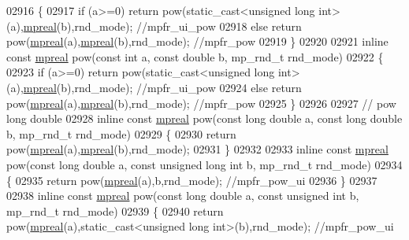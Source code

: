 \begin{DoxyCode}
{{02916 \{
02917     \textcolor{keywordflow}{if} (a>=0)   \textcolor{keywordflow}{return} pow(static\_cast<unsigned long int>(a),\hyperlink{classmpfr_1_1mpreal}{mpreal}(b),rnd\_mode); \textcolor{comment}{//mpfr\_ui\_pow}
02918     \textcolor{keywordflow}{else}        \textcolor{keywordflow}{return} pow(\hyperlink{classmpfr_1_1mpreal}{mpreal}(a),\hyperlink{classmpfr_1_1mpreal}{mpreal}(b),rnd\_mode); \textcolor{comment}{//mpfr\_pow}
02919 \}
02920 
02921 \textcolor{keyword}{inline} \textcolor{keyword}{const} \hyperlink{classmpfr_1_1mpreal}{mpreal} pow(\textcolor{keyword}{const} \textcolor{keywordtype}{int} a, \textcolor{keyword}{const} \textcolor{keywordtype}{double} b, mp\_rnd\_t rnd\_mode)
02922 \{
02923     \textcolor{keywordflow}{if} (a>=0)   \textcolor{keywordflow}{return} pow(static\_cast<unsigned long int>(a),\hyperlink{classmpfr_1_1mpreal}{mpreal}(b),rnd\_mode); \textcolor{comment}{//mpfr\_ui\_pow}
02924     \textcolor{keywordflow}{else}        \textcolor{keywordflow}{return} pow(\hyperlink{classmpfr_1_1mpreal}{mpreal}(a),\hyperlink{classmpfr_1_1mpreal}{mpreal}(b),rnd\_mode); \textcolor{comment}{//mpfr\_pow}
02925 \}
02926 
02927 \textcolor{comment}{// pow long double}
02928 \textcolor{keyword}{inline} \textcolor{keyword}{const} \hyperlink{classmpfr_1_1mpreal}{mpreal} pow(\textcolor{keyword}{const} \textcolor{keywordtype}{long} \textcolor{keywordtype}{double} a, \textcolor{keyword}{const} \textcolor{keywordtype}{long} \textcolor{keywordtype}{double} b, mp\_rnd\_t rnd\_mode)
02929 \{
02930     \textcolor{keywordflow}{return} pow(\hyperlink{classmpfr_1_1mpreal}{mpreal}(a),\hyperlink{classmpfr_1_1mpreal}{mpreal}(b),rnd\_mode);
02931 \}
02932 
02933 \textcolor{keyword}{inline} \textcolor{keyword}{const} \hyperlink{classmpfr_1_1mpreal}{mpreal} pow(\textcolor{keyword}{const} \textcolor{keywordtype}{long} \textcolor{keywordtype}{double} a, \textcolor{keyword}{const} \textcolor{keywordtype}{unsigned} \textcolor{keywordtype}{long} \textcolor{keywordtype}{int} b, mp\_rnd\_t rnd\_mode)
02934 \{
02935     \textcolor{keywordflow}{return} pow(\hyperlink{classmpfr_1_1mpreal}{mpreal}(a),b,rnd\_mode); \textcolor{comment}{//mpfr\_pow\_ui}
02936 \}
02937 
02938 \textcolor{keyword}{inline} \textcolor{keyword}{const} \hyperlink{classmpfr_1_1mpreal}{mpreal} pow(\textcolor{keyword}{const} \textcolor{keywordtype}{long} \textcolor{keywordtype}{double} a, \textcolor{keyword}{const} \textcolor{keywordtype}{unsigned} \textcolor{keywordtype}{int} b, mp\_rnd\_t rnd\_mode)
02939 \{
02940     \textcolor{keywordflow}{return} pow(\hyperlink{classmpfr_1_1mpreal}{mpreal}(a),static\_cast<unsigned long int>(b),rnd\_mode); \textcolor{comment}{//mpfr\_pow\_ui}
}}
\end{DoxyCode}
